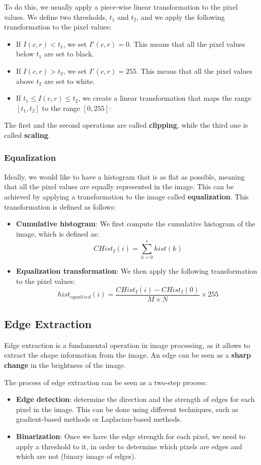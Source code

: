 To do this, we usually apply a piece-wise linear transformation to the pixel values.
We define two thresholds, $t_1$ and $t_2$, and we apply the following transformation to the pixel values:
\begin{itemize}
    \item If $I(c,r) < t_1$, we set $I'(c,r) = 0$. This means that all the pixel values below $t_1$ are set to black.
    \item If $I(c,r) > t_2$, we set $I'(c,r) = 255$. This means that all the pixel values above $t_2$ are set to white.
    \item If $t_1 \leq I(c,r) \leq t_2$, we create a linear transformation that maps the range $[t_1, t_2]$ to the range $[0, 255]$:
\end{itemize}
The first and the second operations are called \textbf{clipping}, while the third one is called \textbf{scaling}.

\subsubsection{Equalization}
Ideally, we would like to have a histogram that is as flat as possible, meaning that all the pixel 
values are equally represented in the image. This can be achieved by applying a transformation to the image
called \textbf{equalization}. This transformation is defined as follows:
\begin{itemize}
    \item \textbf{Cumulative histogram}: We first compute the cumulative histogram of the image, which is defined as:
    \[ CHist_I(i) = \sum_{k=0}^{i} hist(k) \]
    \item \textbf{Equalization transformation}: We then apply the following transformation to the pixel values:
    \[ hist_{equalized}(i) = \frac{CHist_I(i) - CHist_I(0)}{M \times N} \times 255 \]
\end{itemize}

\subsection{Edge Extraction}
Edge extraction is a fundamental operation in image processing, as it allows to extract the shape 
information from the image. An edge can be seen as a \textbf{sharp change} in the brightness of the image.

The process of edge extraction can be seen as a two-step process:
\begin{itemize}
    \item \textbf{Edge detection}: determine the direction and the strength of edges for each pixel in the image.
    This can be done using different techniques, such as gradient-based methods or Laplacian-based methods.
    \item \textbf{Binarization}: Once we have the edge strength for each pixel, we need to apply a threshold to it, 
    in order to determine which pixels are edges and which are not (binary image of edges).
\end{itemize}

